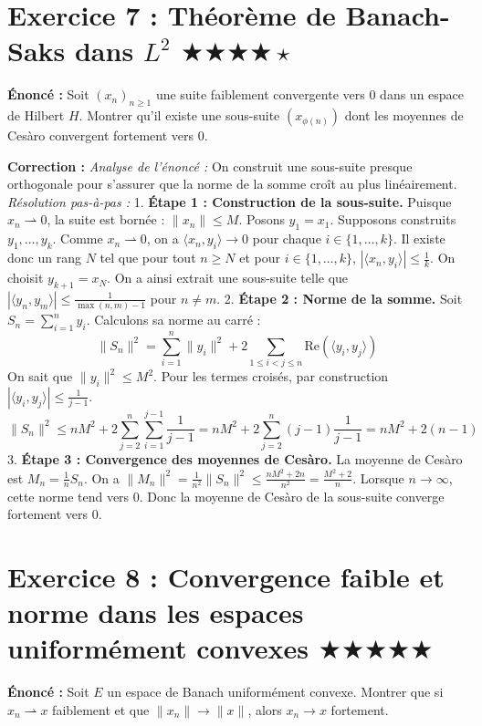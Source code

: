 \documentclass[11pt,a4paper]{article}
\begin{document}
\section{Exercice 7 : Théorème de Banach-Saks dans $L^2$ \quad $\bigstar\bigstar\bigstar\bigstar\star$}

\textbf{Énoncé :}
Soit $(x_n)_{n \ge 1}$ une suite faiblement convergente vers $0$ dans un espace de Hilbert $H$. Montrer qu'il existe une sous-suite $(x_{\phi(n)})$ dont les moyennes de Cesàro convergent fortement vers $0$.

\textbf{Correction :}
\textit{Analyse de l'énoncé :} On construit une sous-suite presque orthogonale pour s'assurer que la norme de la somme croît au plus linéairement.
\textit{Résolution pas-à-pas :}
1. \textbf{Étape 1 : Construction de la sous-suite.}
   Puisque $x_n \rightharpoonup 0$, la suite est bornée : $\|x_n\| \le M$.
   Posons $y_1 = x_1$.
   Supposons construits $y_1, \dots, y_k$.
   Comme $x_n \rightharpoonup 0$, on a $\langle x_n, y_i \rangle \to 0$ pour chaque $i \in \{1, \dots, k\}$.
   Il existe donc un rang $N$ tel que pour tout $n \ge N$ et pour $i \in \{1, \dots, k\}$, $|\langle x_n, y_i \rangle| \le \frac{1}{k}$.
   On choisit $y_{k+1} = x_{N}$. On a ainsi extrait une sous-suite telle que $|\langle y_n, y_m \rangle| \le \frac{1}{\max(n, m)-1}$ pour $n \neq m$.
2. \textbf{Étape 2 : Norme de la somme.}
   Soit $S_n = \sum_{i=1}^n y_i$. Calculons sa norme au carré :
   $$\|S_n\|^2 = \sum_{i=1}^n \|y_i\|^2 + 2 \sum_{1 \le i < j \le n} \text{Re}(\langle y_i, y_j \rangle)$$
   On sait que $\|y_i\|^2 \le M^2$. Pour les termes croisés, par construction $|\langle y_i, y_j \rangle| \le \frac{1}{j-1}$.
   $$\|S_n\|^2 \le n M^2 + 2 \sum_{j=2}^n \sum_{i=1}^{j-1} \frac{1}{j-1} = n M^2 + 2 \sum_{j=2}^n (j-1) \frac{1}{j-1} = n M^2 + 2(n-1)$$
3. \textbf{Étape 3 : Convergence des moyennes de Cesàro.}
   La moyenne de Cesàro est $M_n = \frac{1}{n} S_n$.
   On a $\|M_n\|^2 = \frac{1}{n^2} \|S_n\|^2 \le \frac{n M^2 + 2n}{n^2} = \frac{M^2 + 2}{n}$.
   Lorsque $n \to \infty$, cette norme tend vers 0.
   Donc la moyenne de Cesàro de la sous-suite converge fortement vers $0$.


\section{Exercice 8 : Convergence faible et norme dans les espaces uniformément convexes \quad $\bigstar\bigstar\bigstar\bigstar\bigstar$}

\textbf{Énoncé :}
Soit $E$ un espace de Banach uniformément convexe. Montrer que si $x_n \rightharpoonup x$ faiblement et que $\|x_n\| \to \|x\|$, alors $x_n \to x$ fortement.
\end{document}
